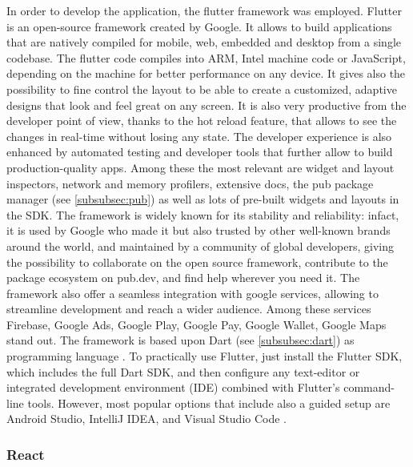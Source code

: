 In order to develop the application, the flutter framework was employed. Flutter is an open-source framework created by Google. It allows to build applications that are natively compiled for mobile, web, embedded and desktop from a single codebase. The flutter code compiles into ARM, Intel machine code or JavaScript, depending on the machine for better performance on any device. It gives also the possibility to fine control the layout to be able to create a customized, adaptive designs that look and feel great on any screen. It is also very productive from the developer point of view, thanks to the hot reload feature, that allows to see the changes in real-time without losing any state. The developer experience is also enhanced by automated testing and developer tools that further allow to build production-quality apps. Among these the most relevant are widget and layout inspectors, network and memory profilers, extensive docs, the pub package manager (see \cref{subsubsec:pub}) as well as lots of pre-built widgets and layouts in the SDK. The framework is widely known for its stability and reliability: infact, it is used by Google who made it but also trusted by other well-known brands around the world, and maintained by a community of global developers, giving the possibility to collaborate on the open source framework, contribute to the package ecosystem on pub.dev, and find help wherever you need it. The framework also offer a seamless integration with google services, allowing to streamline development and reach a wider audience. Among these services Firebase, Google Ads, Google Play, Google Pay, Google Wallet, Google Maps stand out. The framework is based upon Dart (see \cref{subsubsec:dart}) as programming language \cite{Flutter}. To practically use Flutter, just install the Flutter SDK, which includes the full Dart SDK, and then configure any text-editor or integrated development environment (IDE) combined with Flutter's command-line tools. However, most popular options that include also a guided setup are Android Studio, IntelliJ IDEA, and Visual Studio Code \cite{FlutterGetStarted}.

\newpage

\subsubsection{React}

